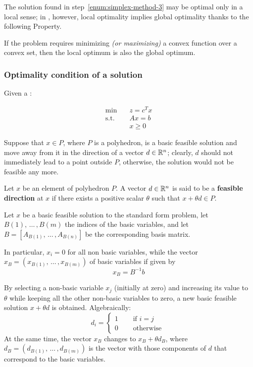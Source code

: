 \documentclass[english]{article}
\begin{document}
\bigskip
The solution found in step~\ref{enum:simplex-method-3} may be optimal only in a local sense;
in \LP, however, local optimality implies global optimality thanks to the following Property.

\begin{property}
  If the \LP problem requires minimizing \textit{(or maximizing)} a convex function over a convex set, then the local optimum is also the global optimum.
  \label{prop:optimal-vertex}
\end{property}

\subsubsection{Optimality condition of a \LP solution}

Given a \LP:

\begin{align*}
  \min \quad        & z = c^T x \\
  \text{s.t.} \quad & Ax = b    \\
                    & x \geq 0
\end{align*}

Suppose that \(x \in P\), where \(P\) is a polyhedron, is a basic feasible solution and move away from it in the direction of a vector \(d \in \mathbb{R}^n\);
clearly, \(d\) should not immediately lead to a point outside \(P\), otherwise, the solution would not be feasible any more.

\begin{definition}
  \label{def:feasible-direction}
  Let \(x\) be an element of polyhedron \(P\).
  A vector \(d \in \mathbb{R}^n\) is said to be a \textbf{feasible direction} at \(x\) if there exists a positive scalar \(\theta\) such that \(x + \theta d \in P\).
\end{definition}

\bigskip
Let \(x\) be a basic feasible solution to the standard form problem, let \(B(1), \, \ldots \,, B(m)\) the indices of the basic variables, and let \(B = \left[ A_{B(1)}, \, \ldots \,, A_{B(n)} \right]\) be the corresponding basis matrix.

In particular, \(x_i = 0\) for all non basic variables, while the vector \(x_B = \left( x_{B(1)}, \, \ldots \,, x_{B(m)} \right)\) of basic variables if given by
\[x_B = B^{-1}b\]

By selecting a non-basic variable \(x_j\) (initially at zero) and increasing its value to \(\theta\) while keeping all the other non-basic variables to zero, a new basic feasible solution \(x + \theta d\) is obtained.
Algebraically:
\[ d_i = \begin{cases}
    1 \quad & \text{ if } i = j  \\
    0 \quad & \text{ otherwise }
  \end{cases} \]
At the same time, the vector \(x_B\) changes to \(x_B + \theta d_B\), where \(d_B = (d_{B(1)}, \, \ldots \,, d_{B(m)})\) is the vector with those components of \(d\) that correspond to the basic variables.
\end{document}
